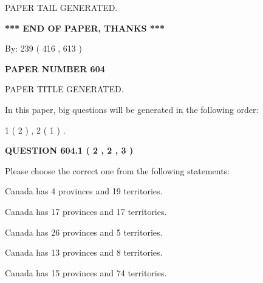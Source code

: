 \documentclass[12pt]{article}
\begin{document}
   
   
\vspace{2.0in} PAPER TAIL GENERATED.
   
   
   
   
\vspace{1.0in} 
{\textbf{\large{ *** END OF PAPER, THANKS *** }}} 
   
   
\hspace{1.0in} By: 
 239 ( 416 ,  613 )
   
   
   
   
\newpage 
\setcounter{page}{ 
   604001 } 
   
   
   
   
 {\textbf{ \Large{ PAPER NUMBER  604  }}}
   
   
\vspace{0.2in}
   
   
   
   
   
   
   
   
 \vspace{0.2in}
 
 
 
 
   
   
 PAPER TITLE GENERATED.
   
   
   
\vspace{0.2in}
   
In this paper, big questions will be generated in the following order: 
   
   
   1 ( 2 )
 ,
   2 ( 1 )
 .
  
\vspace{0.2in}
  
{\textbf{\Large{QUESTION
604.1 
 ( 2 , 2 , 3 )
}}}
  
  
Please choose the correct one from the following statements:
 
 
Canada has   4 provinces and  19 territories.
 
 
Canada has  17 provinces and  17 territories.
 
 
Canada has  26 provinces and  5 territories.
 
 
Canada has  13 provinces and  8 territories.
 
 
Canada has  15 provinces and  74 territories.
 
\end{document}
